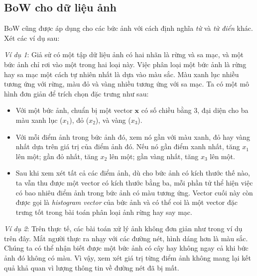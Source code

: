 \subsection{BoW cho dữ liệu ảnh}
BoW cũng được áp dụng cho các bức ảnh với cách định nghĩa \textit{từ} và
\textit{từ điển} khác. Xét các ví dụ sau:

\textit{Ví dụ 1}: Giả sử có một tập dữ liệu ảnh có hai nhãn là rừng và sa mạc, và một bức ảnh chỉ rơi vào một trong hai loại này. Việc phân
loại một bức ảnh là rừng hay sa mạc một cách tự nhiên nhất là dựa vào màu sắc.
Màu xanh lục nhiều tương ứng với rừng, màu đỏ và vàng nhiều tương ứng với sa mạc. Ta có một mô hình đơn giản để trích chọn đặc trưng như sau:
\begin{itemize}
\item Với một bức ảnh, chuẩn bị một vector $\mathbf{x}$ có số chiều bằng 3,
đại diện cho ba màu xanh lục ($x_1$), đỏ ($x_2$), và vàng ($x_3$).

\item Với mỗi điểm ảnh trong bức ảnh đó, xem nó gần với màu xanh, đỏ hay
vàng nhất dựa trên giá trị của điểm ảnh đó. Nếu nó gần điểm xanh nhất, tăng
$x_1$ lên một; gần đỏ nhất, tăng $x_2$ lên một; gần vàng nhất, tăng $x_3$
lên một.

\item Sau khi xem xét tất cả các điểm ảnh, dù cho bức ảnh có kích thước thế
nào, ta vẫn thu được một vector có kích thước bằng ba, mỗi phần tử thể hiện
việc có bao nhiêu điểm ảnh trong bức ảnh có màu tương ứng. Vector cuối này còn
được gọi là \textit{histogram vector} của bức ảnh và có thể coi là một vector đặc trưng tốt trong bài toán phân loại
ảnh rừng hay say mạc.
\end{itemize}

\textit{Ví dụ 2}: Trên thực tế, các bài toán xử lý ảnh không đơn giản như trong
ví dụ trên đây. Mắt người thực ra nhạy với các đường nét, hình dáng hơn là màu
sắc. Chúng ta có thể nhận biết được một bức ảnh có cây hay không ngay cả khi bức
ảnh đó không có màu. Vì vậy, xem xét giá trị từng điểm ảnh không mang lại kết
quả khả quan vì lượng thông tin về đường nét đã bị mất.


